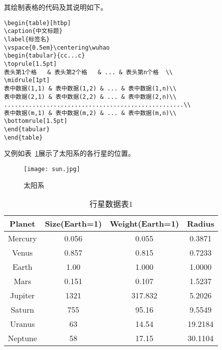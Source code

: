 其绘制表格的代码及其说明如下。
\vspace{1em}
\begin{lstlisting}
\begin{table}[htbp]
\caption{中文标题}
\label{标签名}
\vspace{0.5em}\centering\wuhao
\begin{tabular}{cc...c}
\toprule[1.5pt]
表头第1个格   & 表头第2个格   & ... & 表头第n个格  \\
\midrule[1pt]
表中数据(1,1) & 表中数据(1,2) & ... & 表中数据(1,n)\\
表中数据(2,1) & 表中数据(2,2) & ... & 表中数据(2,n)\\
...................................................\\
表中数据(m,1) & 表中数据(m,2) & ... & 表中数据(m,n)\\
\bottomrule[1.5pt]
\end{tabular}
\end{table}
\end{lstlisting}

又例如表~\ref{tab:xingxing}展示了太阳系的各行星的位置。
\begin{figure}[htbp]
  \centering
  \texttt{[image: sun.jpg]}
  \caption{太阳系}
  \label{fig:sun}
\end{figure}

\begin{table}[htbp]
  \caption{行星数据表1}
  \label{tab:xingxing}
  \centering
  \vspace{0.2cm}
  \wuhao
  \begin{tabular}{cccc}
    \toprule
    Planet  & Size(Earth=1) & Weight(Earth=1) & Radius  \\
    \midrule
    Mercury & 0.056         & 0.055           & 0.3871  \\
    Venus   & 0.857         & 0.815           & 0.7233  \\
    Earth   & 1.00          & 1.000           & 1.0000  \\
    Mars    & 0.151         & 0.107           & 1.5237  \\
    Jupiter & 1321          & 317.832         & 5.2026  \\
    Saturn  & 755           & 95.16           & 9.5549  \\
    Uranus  & 63            & 14.54           & 19.2184 \\
    Neptune & 58            & 17.15           & 30.1104 \\
    \bottomrule
  \end{tabular}
\end{table}


